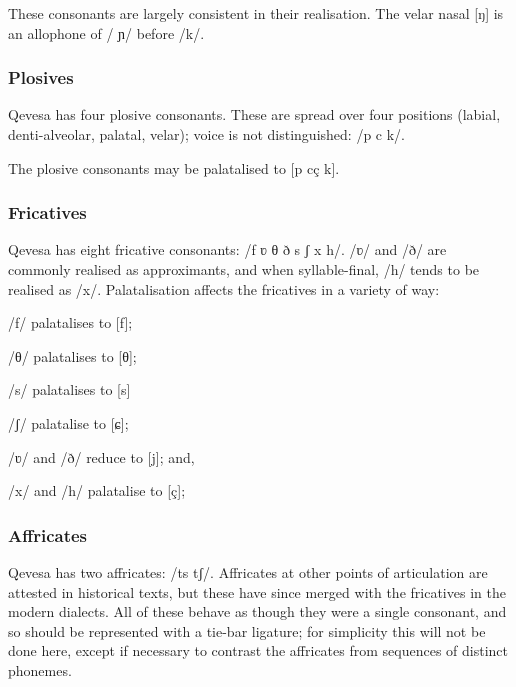 \documentclass[grammar]{subfiles}
\begin{document}
  These consonants are largely consistent in their realisation. %
  The velar nasal [ŋ] is an allophone of / ɲ/ before /k/.

  \subsubsection{Plosives}
  \label{sssec:plosives}

  Qevesa has four plosive consonants. These are spread over four positions (labial, denti-alveolar, palatal, velar); voice is not distinguished: /p  c k/. 
  
  The plosive consonants may be palatalised to [p\superj{}  cç k\superj].

  \subsubsection{Fricatives}
  \label{sssec:fricatives}

  Qevesa has eight fricative consonants: /f ʋ θ ð s ʃ x h/. /ʋ/ and /ð/ are commonly realised as approximants, and when syllable-final, /h/ tends to be realised as /x/. 
  Palatalisation affects the fricatives in a variety of way: 
 
  \begin{itemize*}
    \item /f/ palatalises to [f\superj];
    \item /θ/ palatalises to [θ\superj];
    \item /s/ palatalises to [s\superj]
    \item /ʃ/ palatalise to [ɕ];
    \item /ʋ/ and /ð/ reduce to [j]; and,
    \item /x/ and /h/ palatalise to [ç];
  \end{itemize*}

  \subsubsection{Affricates}
  \label{sssec:affricates}

  Qevesa has two affricates: /ts tʃ/. Affricates at other points of articulation are attested in historical texts, but these have since merged with the fricatives in the modern dialects. All of these behave as though they were a single consonant, and so should be represented with a tie-bar ligature; for simplicity this will not be done here, except if necessary to contrast the affricates from sequences of distinct phonemes. 
\end{document}
